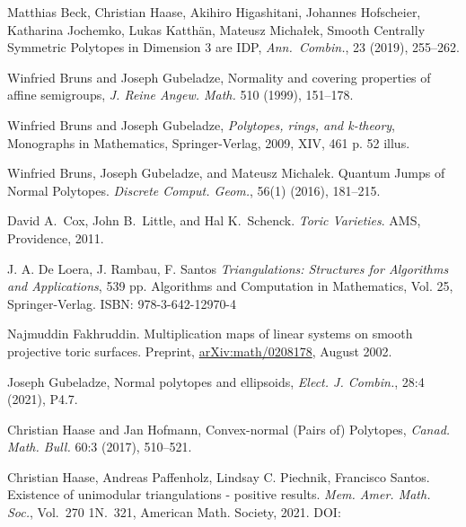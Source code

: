 \documentclass{amsart}
\theoremstyle{plain}
\theoremstyle{definition}
\begin{document}
\begin{thebibliography}{99} 

Matthias Beck, Christian Haase, Akihiro Higashitani, Johannes Hofscheier, Katharina Jochemko, Lukas Katth\"an, Mateusz Micha{\l}ek,
Smooth Centrally Symmetric Polytopes in Dimension 3 are IDP,
\emph{Ann.~Combin.}, 23 (2019), 255--262.


Winfried Bruns and Joseph Gubeladze, Normality and covering properties of affine semigroups, \emph{J. Reine Angew. Math.} 510 (1999), 151--178. 

Winfried Bruns and Joseph Gubeladze, \emph{Polytopes, rings, and k-theory}, Monographs in Mathematics,
  Springer-Verlag, 2009, XIV, 461 p. 52 illus.
  
  Winfried Bruns, Joseph Gubeladze, and Mateusz Michalek. Quantum Jumps of Normal Polytopes. \emph{Discrete Comput. Geom.}, 56(1) (2016), 181--215. 
  
David A.~Cox, John B.~Little, and Hal K.~Schenck.
{\em {T}oric {V}arieties}.
AMS, Providence, 2011.

J. A. De Loera, J. Rambau, F. Santos
\emph{Triangulations: Structures for Algorithms and Applications}, 539 pp.
Algorithms and Computation in Mathematics, Vol. 25, Springer-Verlag. 
ISBN: 978-3-642-12970-4

Najmuddin Fakhruddin.
\newblock Multiplication maps of linear systems on smooth projective toric surfaces.
  Preprint, 
  \href{https://arxiv.org/abs/math/0208178}{arXiv:math/0208178}, August 2002.



Joseph Gubeladze,
Normal polytopes and ellipsoids,
\emph{Elect. J. Combin.}, 28:4 (2021), P4.7.
    

Christian Haase and Jan Hofmann, 
Convex-normal (Pairs of) Polytopes, 
\emph{Canad. Math. Bull.} 60:3 (2017), 510--521. 

Christian Haase, Andreas Paffenholz, Lindsay C. Piechnik, Francisco Santos. Existence of unimodular triangulations - positive results. 
 \emph{Mem. Amer. Math. Soc.},  Vol.~270 1N.~321, American Math. Society, 2021. DOI: 
 

\end{thebibliography}
\end{document}
